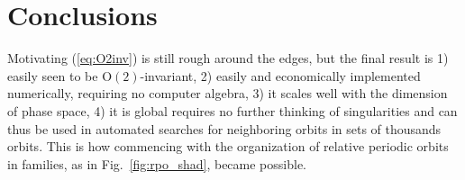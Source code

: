 \documentclass[aip,cha,showpacs,twocolumn,
 		  reprint]{revtex4-1} %
\newcommand{\refeq}  [1] {(\ref{#1})}
\newcommand{\reffig} [1] {Fig.~\ref{#1}}
\newcommand{\On}[1]{\ensuremath{\textrm{O}(#1)}}
\begin{document}
\section{Conclusions}

Motivating \refeq{eq:O2inv} is still rough around the edges, but the final result is
1) easily seen to be $\On{2}$-invariant, 2) easily and economically
implemented numerically, requiring no computer algebra, 3) it scales well
with the dimension of phase space, 4) it is global requires no further
thinking of singularities and can thus be used in automated searches for
neighboring orbits in sets of thousands orbits. This is how commencing with the
organization of relative periodic orbits in families, as in \reffig{fig:rpo_shad},
became possible.


\end{document}
